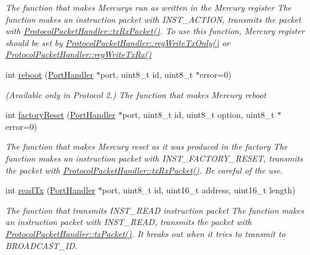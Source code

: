 \begin{DoxyCompactItemize}
\begin{DoxyCompactList}\small\item\em The function that makes Mercurys run as written in the Mercury register  The function makes an instruction packet with I\+N\+S\+T\+\_\+\+A\+C\+T\+I\+ON,  transmits the packet with \hyperlink{classmercury_1_1_protocol_packet_handler_a68b02f23af616886d0795ea12debd613}{Protocol\+Packet\+Handler\+::tx\+Rx\+Packet()}.  To use this function, Mercury register should be set by \hyperlink{classmercury_1_1_protocol_packet_handler_af43e9f53d3e295b12b69f4b99c8c1746}{Protocol\+Packet\+Handler\+::reg\+Write\+Tx\+Only()} or \hyperlink{classmercury_1_1_protocol_packet_handler_a314845a3e5d2030e56db2739310ad117}{Protocol\+Packet\+Handler\+::reg\+Write\+Tx\+Rx()} \end{DoxyCompactList}\item 
int \hyperlink{classmercury_1_1_protocol_packet_handler_ada4e23e49d86234efad935480b6886f0}{reboot} (\hyperlink{classmercury_1_1_port_handler}{Port\+Handler} $\ast$port, uint8\+\_\+t id, uint8\+\_\+t $\ast$error=0)
\begin{DoxyCompactList}\small\item\em (Available only in Protocol 2.) The function that makes Mercury reboot \end{DoxyCompactList}\item 
int \hyperlink{classmercury_1_1_protocol_packet_handler_ad658bff867e99f76c3b3c7cd93572041}{factory\+Reset} (\hyperlink{classmercury_1_1_port_handler}{Port\+Handler} $\ast$port, uint8\+\_\+t id, uint8\+\_\+t option, uint8\+\_\+t $\ast$error=0)
\begin{DoxyCompactList}\small\item\em The function that makes Mercury reset as it was produced in the factory  The function makes an instruction packet with I\+N\+S\+T\+\_\+\+F\+A\+C\+T\+O\+R\+Y\+\_\+\+R\+E\+S\+ET,  transmits the packet with \hyperlink{classmercury_1_1_protocol_packet_handler_a68b02f23af616886d0795ea12debd613}{Protocol\+Packet\+Handler\+::tx\+Rx\+Packet()}.  Be careful of the use. \end{DoxyCompactList}\item 
int \hyperlink{classmercury_1_1_protocol_packet_handler_aebb2c28d6b3f2e87c7a56b757a24810b}{read\+Tx} (\hyperlink{classmercury_1_1_port_handler}{Port\+Handler} $\ast$port, uint8\+\_\+t id, uint16\+\_\+t address, uint16\+\_\+t length)
\begin{DoxyCompactList}\small\item\em The function that transmits I\+N\+S\+T\+\_\+\+R\+E\+AD instruction packet  The function makes an instruction packet with I\+N\+S\+T\+\_\+\+R\+E\+AD,  transmits the packet with \hyperlink{classmercury_1_1_protocol_packet_handler_a245f01395d9684bc58788e8a06de3ffc}{Protocol\+Packet\+Handler\+::tx\+Packet()}.  It breaks out  when it tries to transmit to B\+R\+O\+A\+D\+C\+A\+S\+T\+\_\+\+ID. \end{DoxyCompactList}\item 

\end{DoxyCompactItemize}
